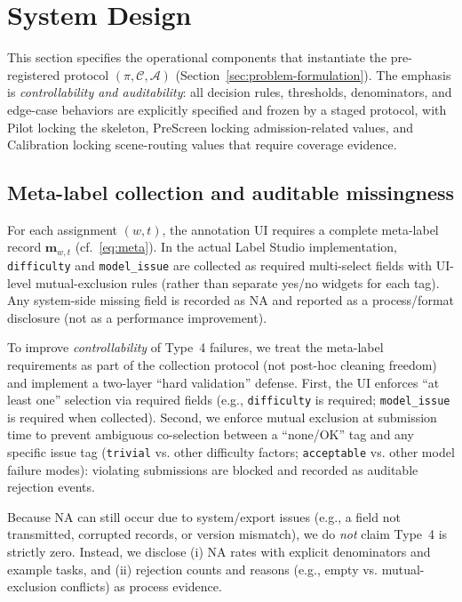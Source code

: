 \section{System Design}
\label{sec:system-design}

This section specifies the operational components that instantiate the pre-registered protocol
$(\pi,\mathcal{C},\mathcal{A})$ (Section~\ref{sec:problem-formulation}). The emphasis is
\emph{controllability and auditability}: all decision rules, thresholds, denominators, and edge-case
behaviors are explicitly specified and frozen by a staged protocol, with Pilot locking the skeleton,
PreScreen locking admission-related values, and Calibration locking scene-routing values that require
coverage evidence.

\subsection{Meta-label collection and auditable missingness}

For each assignment $(w,t)$, the annotation UI requires a complete meta-label record $\mathbf{m}_{w,t}$
(cf.~\eqref{eq:meta}). In the actual Label Studio implementation, \texttt{difficulty} and \texttt{model\_issue}
are collected as required multi-select fields with UI-level mutual-exclusion rules (rather than separate
yes/no widgets for each tag). Any system-side missing field is recorded as NA and
reported as a process/format disclosure (not as a performance improvement).

To improve \emph{controllability} of Type~4 failures, we treat the meta-label requirements as part of the
collection protocol (not post-hoc cleaning freedom) and implement a two-layer ``hard validation'' defense.
First, the UI enforces ``at least one'' selection via required fields (e.g., \texttt{difficulty} is required;
\texttt{model\_issue} is required when collected). Second, we enforce mutual exclusion at submission time
to prevent ambiguous co-selection between a ``none/OK'' tag and any specific issue tag (\texttt{trivial} vs.
other difficulty factors; \texttt{acceptable} vs. other model failure modes): violating submissions are
blocked and recorded as auditable rejection events.

Because NA can still occur due to system/export issues (e.g., a field not transmitted, corrupted records, or
version mismatch), we do \emph{not} claim Type~4 is strictly zero. Instead, we disclose (i) NA rates with
explicit denominators and example tasks, and (ii) rejection counts and reasons (e.g., empty vs.
mutual-exclusion conflicts) as process evidence.

